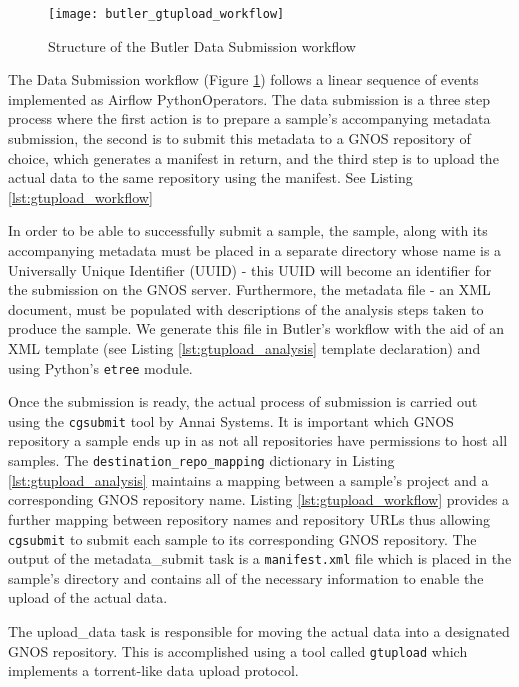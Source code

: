 \begin{figure}[H]
\texttt{[image: butler\_gtupload\_workflow]}
\centering
\caption {Structure of the Butler Data Submission workflow}
\label{fig:butler_gtupload_workflow}
\end{figure}

The Data Submission workflow (Figure \ref{fig:butler_gtupload_workflow}) follows a linear sequence of events implemented as Airflow PythonOperators. The data submission is a three step process where the first action is to prepare a sample's accompanying metadata submission, the second is to submit this metadata to a GNOS repository of choice, which generates a manifest in return, and the third step is to upload the actual data to the same repository using the manifest. See Listing \ref{lst:gtupload_workflow}

In order to be able to successfully submit a sample, the sample, along with its accompanying metadata must be placed in a separate directory whose name is a Universally Unique Identifier (UUID) - this UUID will become an identifier for the submission on the GNOS server. Furthermore, the metadata file - an XML document, must be populated with descriptions of the analysis steps taken to produce the sample. We generate this file in Butler's workflow with the aid of an XML template (see Listing \ref{lst:gtupload_analysis} template declaration) and using Python's \texttt{etree} module.

Once the submission is ready, the actual process of submission is carried out using the \texttt{cgsubmit} tool by Annai Systems. It is important which GNOS repository a sample ends up in as not all repositories have permissions to host all samples. The \texttt{destination_repo_mapping} dictionary in Listing \ref{lst:gtupload_analysis} maintains a mapping between a sample's project and a corresponding GNOS repository name. Listing \ref{lst:gtupload_workflow} provides a further mapping between repository names and repository URLs thus allowing \texttt{cgsubmit} to submit each sample to its corresponding GNOS repository. The output of the metadata\_submit task is a \texttt{manifest.xml} file which is placed in the sample's directory and contains all of the necessary information to enable the upload of the actual data.

The upload\_data task is responsible for moving the actual data into a designated GNOS repository. This is accomplished using a tool called \texttt{gtupload} which implements a torrent-like data upload protocol. 

